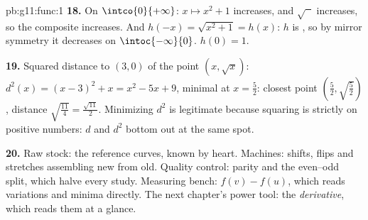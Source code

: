 \begin{solution}{pb:g11:func:1}
\textbf{18.} On $\intco{0}{+\infty}$: $x \mapsto x^2 + 1$
increases, and $\sqrt{\phantom{x}}$ increases, so the
composite increases. And $h(-x) = \sqrt{x^2 + 1} = h(x)$: $h$
is , so by mirror symmetry it decreases on
$\intoc{-\infty}{0}$.  $h(0) = 1$.

\textbf{19.} Squared distance to $(3, 0)$ of the point
$(x, \sqrt x)$:
$d^2(x) = (x - 3)^2 + x = x^2 - 5x + 9$, minimal at
$x = \frac52$: closest point
$\left(\frac52, \sqrt{\frac52}\right)$, distance
$\sqrt{\frac{11}{4}} = \frac{\sqrt{11}}{2}$. Minimizing $d^2$
is legitimate because squaring is strictly  on
positive numbers: $d$ and $d^2$ bottom out at the same spot.

\textbf{20.} Raw stock: the reference curves, known by heart.
Machines: shifts, flips and stretches assembling new 
from old. Quality control: parity and the even--odd split,
which halve every study. Measuring bench: 
$f(v) - f(u)$, which reads variations and minima directly. The
next chapter's power tool: the \emph{derivative}, which reads
them at a glance.
\end{solution}
